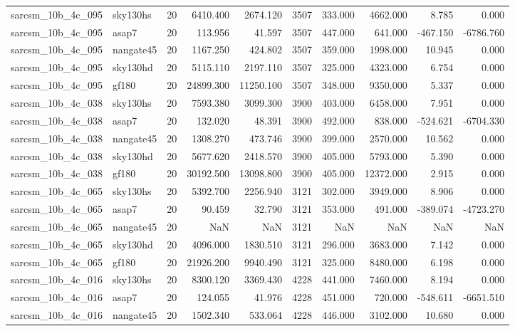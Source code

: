 \begin{tabular}{llrrrrrrrr}
sarcsm\_10b\_4c\_095 & sky130hs & 20 & 6410.400 & 2674.120 & 3507 & 333.000 & 4662.000 & 8.785 & 0.000 \\
sarcsm\_10b\_4c\_095 & asap7 & 20 & 113.956 & 41.597 & 3507 & 447.000 & 641.000 & -467.150 & -6786.760 \\
sarcsm\_10b\_4c\_095 & nangate45 & 20 & 1167.250 & 424.802 & 3507 & 359.000 & 1998.000 & 10.945 & 0.000 \\
sarcsm\_10b\_4c\_095 & sky130hd & 20 & 5115.110 & 2197.110 & 3507 & 325.000 & 4323.000 & 6.754 & 0.000 \\
sarcsm\_10b\_4c\_095 & gf180 & 20 & 24899.300 & 11250.100 & 3507 & 348.000 & 9350.000 & 5.337 & 0.000 \\
sarcsm\_10b\_4c\_038 & sky130hs & 20 & 7593.380 & 3099.300 & 3900 & 403.000 & 6458.000 & 7.951 & 0.000 \\
sarcsm\_10b\_4c\_038 & asap7 & 20 & 132.020 & 48.391 & 3900 & 492.000 & 838.000 & -524.621 & -6704.330 \\
sarcsm\_10b\_4c\_038 & nangate45 & 20 & 1308.270 & 473.746 & 3900 & 399.000 & 2570.000 & 10.562 & 0.000 \\
sarcsm\_10b\_4c\_038 & sky130hd & 20 & 5677.620 & 2418.570 & 3900 & 405.000 & 5793.000 & 5.390 & 0.000 \\
sarcsm\_10b\_4c\_038 & gf180 & 20 & 30192.500 & 13098.800 & 3900 & 405.000 & 12372.000 & 2.915 & 0.000 \\
sarcsm\_10b\_4c\_065 & sky130hs & 20 & 5392.700 & 2256.940 & 3121 & 302.000 & 3949.000 & 8.906 & 0.000 \\
sarcsm\_10b\_4c\_065 & asap7 & 20 & 90.459 & 32.790 & 3121 & 353.000 & 491.000 & -389.074 & -4723.270 \\
sarcsm\_10b\_4c\_065 & nangate45 & 20 & NaN & NaN & 3121 & NaN & NaN & NaN & NaN \\
sarcsm\_10b\_4c\_065 & sky130hd & 20 & 4096.000 & 1830.510 & 3121 & 296.000 & 3683.000 & 7.142 & 0.000 \\
sarcsm\_10b\_4c\_065 & gf180 & 20 & 21926.200 & 9940.490 & 3121 & 325.000 & 8480.000 & 6.198 & 0.000 \\
sarcsm\_10b\_4c\_016 & sky130hs & 20 & 8300.120 & 3369.430 & 4228 & 441.000 & 7460.000 & 8.194 & 0.000 \\
sarcsm\_10b\_4c\_016 & asap7 & 20 & 124.055 & 41.976 & 4228 & 451.000 & 720.000 & -548.611 & -6651.510 \\
sarcsm\_10b\_4c\_016 & nangate45 & 20 & 1502.340 & 533.064 & 4228 & 446.000 & 3102.000 & 10.680 & 0.000 \\

\end{tabular}
